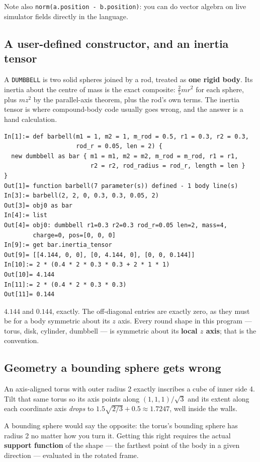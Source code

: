 \documentclass[11pt]{article}
\newcommand{\kw}[1]{\texttt{\uppercase{#1}}}
\newcommand{\code}[1]{\texttt{#1}}
\begin{document}
Note also \code{norm(a.position - b.position)}: you can do vector
algebra on live simulator fields directly in the language.

\subsection{A user-defined constructor, and an inertia tensor}

A \kw{dumbbell} is two solid spheres joined by a rod, treated as
\textbf{one rigid body}. Its inertia about the centre of mass is the
exact composite: $\tfrac25 mr^2$ for each sphere, plus $mz^2$ by the
parallel-axis theorem, plus the rod's own terms. The inertia tensor is
where compound-body code usually goes wrong, and the answer is a hand
calculation.

\begin{lstlisting}
In[1]:= def barbell(m1 = 1, m2 = 1, m_rod = 0.5, r1 = 0.3, r2 = 0.3,
                    rod_r = 0.05, len = 2) {
  new dumbbell as bar { m1 = m1, m2 = m2, m_rod = m_rod, r1 = r1,
                        r2 = r2, rod_radius = rod_r, length = len }
}
Out[1]= function barbell(7 parameter(s)) defined - 1 body line(s)
In[3]:= barbell(2, 2, 0, 0.3, 0.3, 0.05, 2)
Out[3]= obj0 as bar
In[4]:= list
Out[4]= obj0: dumbbell r1=0.3 r2=0.3 rod_r=0.05 len=2, mass=4,
        charge=0, pos=[0, 0, 0]
In[9]:= get bar.inertia_tensor
Out[9]= [[4.144, 0, 0], [0, 4.144, 0], [0, 0, 0.144]]
In[10]:= 2 * (0.4 * 2 * 0.3 * 0.3 + 2 * 1 * 1)
Out[10]= 4.144
In[11]:= 2 * (0.4 * 2 * 0.3 * 0.3)
Out[11]= 0.144
\end{lstlisting}

$4.144$ and $0.144$, exactly. The off-diagonal entries are exactly zero,
as they must be for a body symmetric about its $z$ axis. Every round
shape in this program --- torus, disk, cylinder, dumbbell --- is
symmetric about its \textbf{local $z$ axis}; that is the convention.

\subsection{Geometry a bounding sphere gets wrong}

An axis-aligned torus with outer radius 2 exactly inscribes a cube of
inner side 4. Tilt that same torus so its axis points along
$(1,1,1)/\sqrt3$ and its extent along each coordinate axis \emph{drops}
to $1.5\sqrt{2/3} + 0.5 \approx 1.7247$, well inside the walls.

A bounding sphere would say the opposite: the torus's bounding sphere
has radius 2 no matter how you turn it. Getting this right requires the
actual \textbf{support function} of the shape --- the farthest point of
the body in a given direction --- evaluated in the rotated frame.
\end{document}
